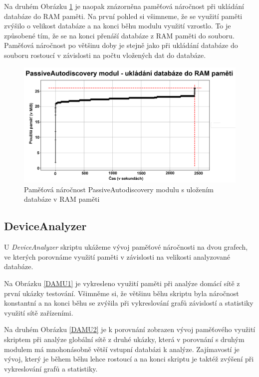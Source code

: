 \documentclass[thesis=B,czech,hidelinks]{FITthesis}[2019/03/21]
\begin{document}
    Na druhém Obrázku \ref{PAMU2} je naopak znázorněna paměťová náročnost při ukládání databáze do RAM paměti. Na první pohled si všimneme, že se využití paměti zvýšilo o velikost databáze a na konci běhu modulu využití vzrostlo. To je způsobené tím, že se na konci přenáší databáze z RAM paměti do souboru. Paměťová náročnost po většinu doby je stejně jako při ukládání databáze do souboru rostoucí v závislosti na počtu vložených dat do databáze. 
    \begin{figure}[h!]
        \centering
        \includegraphics[width=\textwidth]{GlobalRAM.png}
        \caption[Paměťová náročnost: PassiveAutodiscovery modulu s uložením databáze v RAM paměti]{Paměťová náročnost PassiveAutodiscovery modulu s uložením databáze v RAM paměti}
        \label{PAMU2}
    \end{figure}
    
    \newpage
    \subsection{DeviceAnalyzer}
    U \emph{DeviceAnalyzer} skriptu ukážeme vývoj paměťové náročnosti na dvou grafech, ve kterých porovnáme využití paměti v závislosti na velikosti analyzované databáze.
    
    Na Obrázku \ref{DAMU1} je vykresleno využití paměti při analýze domácí sítě z první ukázky testování. Všimněme si, že většinu běhu skriptu byla náročnost konstantní a na konci běhu se zvýšila při vykreslování grafů závislostí a statistiky využití sítě zařízeními.
    
    Na druhém Obrázku \ref{DAMU2} je k porovnání zobrazen vývoj paměťového využití skriptem při analýze globální sítě z druhé ukázky, která v porovnání s druhým modulem má mnohonásobně větší vstupní databázi k analýze. Zajímavostí je vývoj, který je během běhu lehce rostoucí a na konci skriptu je taktéž zvýšení při vykreslování grafů a statistiky.
    
\end{document}
